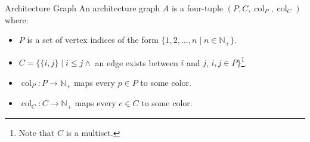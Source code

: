 \begin{defn}{Architecture Graph}
  An architecture graph $A$ is a four-tuple $(P, C, \operatorname{col}_P,
  \operatorname{col}_C)$ where:
  \begin{itemize}
    \item $P$ is a set of vertex indices of the form $\{1, 2, \dots, n \mid n
          \in \mathbb{N}_+\}$.
    \item $C = \{\{i, j\} \mid i \leq j \land$ an edge exists
                 between $i$ and $j$, $i, j \in P\}$\footnote{Note that $C$ is a
                 multiset.}.
    \item $\operatorname{col}_P: P \rightarrow \mathbb{N}_+$ maps every $p \in
          P$ to some color.
    \item $\operatorname{col}_C: C \rightarrow \mathbb{N}_+$ maps every $c \in C$
          to some color.
  \end{itemize}
\end{defn}

